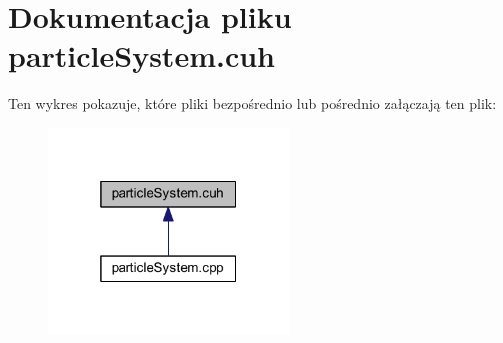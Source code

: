 \hypertarget{particle_system_8cuh}{\section{Dokumentacja pliku particle\-System.\-cuh}
\label{particle_system_8cuh}
}
Ten wykres pokazuje, które pliki bezpośrednio lub pośrednio załączają ten plik\-:\nopagebreak
\begin{figure}[H]
\begin{center}
\leavevmode
\includegraphics[width=181pt]{particle_system_8cuh__dep__incl}
\end{center}
\end{figure}
